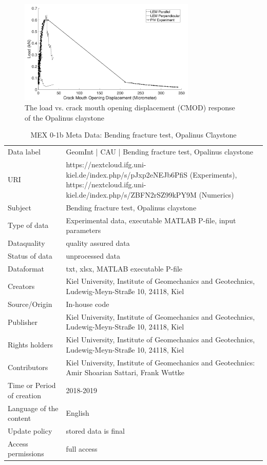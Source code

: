 \begin{figure}[!ht]
\centering
\includegraphics[width=0.75\textwidth]{figures/Amir_ME1_LEM_Claystone_Data.png}
\caption{The load vs. crack mouth opening displacement (CMOD) response of the Opalinus claystone}
\label{fig:Amir_ME1_LEM_Claystone_Data}
\end{figure}

\begin{table}[!ht]
\caption{MEX 0-1b Meta Data: Bending fracture test, Opalinus Claystone}
\label{tab:dms-mex0-1b}
\small
\begin{tabular}{R{3cm}|L{7cm}}
\hline
%
Data label & GeomInt | CAU |  Bending fracture test, Opalinus claystone \\
URI &  https://nextcloud.ifg.uni-kiel.de/index.php/s/pJxp2eNEJb6PfiS (Experiments), https://nextcloud.ifg.uni-kiel.de/index.php/s/ZBFN2rSZ99kPY9M (Numerics)\\
Subject  &  Bending fracture test, Opalinus claystone\\
Type of data  &  Experimental data, executable MATLAB P-file, input parameters\\
Dataquality  &  quality assured data \\
Status of data  &  unprocessed data\\
Dataformat  & txt, xlsx, MATLAB executable P-file\\
Creators  &  Kiel University, Institute of Geomechanics and Geotechnics, Ludewig-Meyn-Stra\ss e 10, 24118, Kiel\\
Source/Origin & In-house code \\
Publisher  &  Kiel University, Institute of Geomechanics and Geotechnics, Ludewig-Meyn-Stra\ss e 10, 24118, Kiel \\
Rights holders &  Kiel University, Institute of Geomechanics and Geotechnics, Ludewig-Meyn-Stra\ss e 10, 24118, Kiel \\
Contributors &   Kiel University, Institute of Geomechanics and Geotechnics: Amir Shoarian Sattari, Frank Wuttke\\
Time or Period of creation &  2018-2019\\
Language of the content &  English\\
Update policy &  stored data is final\\
Access permissions & full access\\
%
\hline
\end{tabular}
\end{table}

